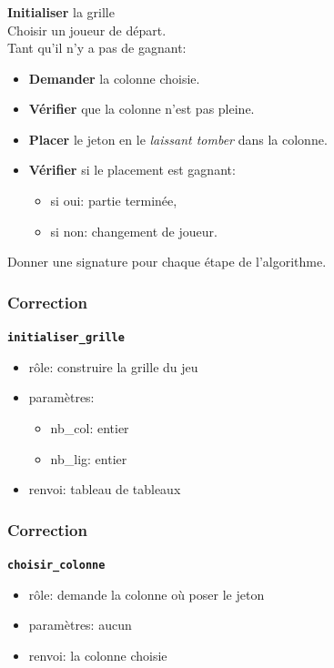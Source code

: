 \documentclass[svgnames,11pt]{beamer}
\begin{document}
\begin{frame}
    \frametitle{}
    \textbf{Initialiser} la grille\\
    Choisir un joueur de départ.\\
    Tant qu'il n'y a pas de gagnant:
    \begin{itemize}
        \item \textbf{Demander} la colonne choisie.
        \item \textbf{Vérifier} que la colonne n'est pas pleine.
        \item \textbf{Placer} le jeton en le \emph{laissant tomber} dans la colonne.
        \item \textbf{Vérifier} si le placement est gagnant:
              \begin{itemize}
                  \item si oui: partie terminée,
                  \item si non: changement de joueur.
              \end{itemize}
    \end{itemize}
    \begin{activite}
        Donner une signature pour chaque étape de l'algorithme.
    \end{activite}

\end{frame}
\begin{frame}
    \frametitle{Correction}
    {\Large \textbf{\texttt{initialiser\_grille}}}
    \begin{itemize}
        \item rôle: construire la grille du jeu
        \item paramètres:
        \begin{itemize}
            \item nb\_col: entier
            \item nb\_lig: entier
        \end{itemize}
        \item renvoi: tableau de tableaux
    \end{itemize}

\end{frame}
\begin{frame}
    \frametitle{Correction}

    {\Large \textbf{\texttt{choisir\_colonne}}}
    \begin{itemize}
        \item rôle: demande la colonne où poser le jeton
        \item paramètres: aucun
        \item renvoi: la colonne choisie
    \end{itemize}

\end{frame}
\end{document}
